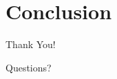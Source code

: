 \documentclass{beamer}
\begin{document}
\section{Conclusion}
\begin{frame}
\begin{center}
\Huge
 Thank You!

Questions?

\vspace{0.2in}

\normalsize

\href{mailto:student@allegheny.edu}{}

\vspace{0.1in}

\href{http://cs.allegheny.edu/}{}

\end{center}
\end{frame}
\end{document}
